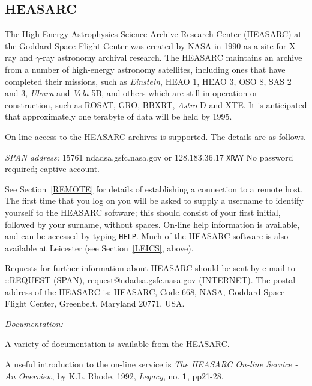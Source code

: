 \documentclass[twoside,11pt]{article}
\newcommand{\xlabel}[1]{}
\begin{document}
\subsection{HEASARC
\xlabel{heasarc}\label{HEASARC}}

The High Energy Astrophysics Science Archive Research Center (HEASARC)
at the Goddard Space Flight Center was created by NASA in 1990 as a site
for X-ray and $\gamma$-ray astronomy archival research. The HEASARC 
maintains an archive from a number of high-energy astronomy satellites,
including ones that have completed their missions, such as {\it 
Einstein}, HEAO 1, HEAO 3, OSO 8, SAS 2 and 3, {\it Uhuru} and {\it 
Vela} 5B, and others which are still in operation or construction, such 
as ROSAT, GRO, BBXRT, {\it Astro}-D and XTE. It is anticipated that 
approximately one terabyte of data will be held by 1995.

On-line access to the HEASARC archives is supported. The details are as 
follows.

{\it SPAN address: } 15761
 ndadsa.gsfc.nasa.gov or 128.183.36.17
 \verb-XRAY-
 No password required; captive account.

See Section~\ref{REMOTE} for details of establishing a connection to
a remote host. The first time that you log on you will be asked to 
supply a username to identify yourself to the HEASARC software; this 
should consist of your first initial, followed by your surname, without 
spaces. On-line help information is available, and can be accessed by 
typing \verb-HELP-. Much of the HEASARC software is also available at
Leicester (see Section~\ref{LEICS}, above).

Requests for further information about HEASARC should be sent by e-mail
to 
::REQUEST (SPAN), request@ndadsa.gsfc.nasa.gov (INTERNET).
The postal address of the HEASARC is: HEASARC, Code 668, NASA, Goddard 
Space Flight Center, Greenbelt, Maryland 20771, USA.

{\it Documentation:}

A variety of documentation is available from the HEASARC.

A useful introduction to the on-line service is {\it The HEASARC On-line
Service - An Overview}, by K.L. Rhode, 1992, {\it Legacy}, no. {\bf 1}, 
pp21-28.
\end{document}
